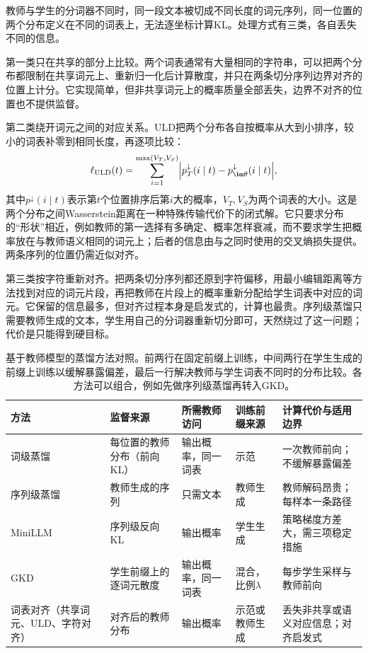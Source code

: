 教师与学生的分词器不同时，同一段文本被切成不同长度的词元序列，同一位置的两个分布定义在不同的词表上，无法逐坐标计算KL。处理方式有三类，各自丢失不同的信息。

第一类只在共享的部分上比较。两个词表通常有大量相同的字符串，可以把两个分布都限制在共享词元上、重新归一化后计算散度，并只在两条切分序列边界对齐的位置上计分。它实现简单，但非共享词元上的概率质量全部丢失，边界不对齐的位置也不提供监督。

第二类绕开词元之间的对应关系。ULD把两个分布各自按概率从大到小排序，较小的词表补零到相同长度，再逐项比较：
\begin{equation}
 \ell_{\mathrm{ULD}}(t)=\sum_{i=1}^{\max(V_T,V_S)}\Bigl\lvert p_T^{\downarrow}(i\mid t)-p_{\bm\theta}^{\downarrow}(i\mid t)\Bigr\rvert,
 \label{eq:nlp-sft-uld}
\end{equation}
其中$p^{\downarrow}(i\mid t)$表示第$t$个位置排序后第$i$大的概率，$V_T,V_S$为两个词表的大小。这是两个分布之间Wasserstein距离在一种特殊传输代价下的闭式解。它只要求分布的“形状”相近，例如教师的第一选择有多确定、概率怎样衰减，而不要求学生把概率放在与教师语义相同的词元上；后者的信息由与之同时使用的交叉熵损失提供。两条序列的位置仍需近似对齐。

第三类按字符重新对齐。把两条切分序列都还原到字符偏移，用最小编辑距离等方法找到对应的词元片段，再把教师在片段上的概率重新分配给学生词表中对应的词元。它保留的信息最多，但对齐过程本身是启发式的，计算也最贵。序列级蒸馏只需要教师生成的文本，学生用自己的分词器重新切分即可，天然绕过了这一问题；代价是只能得到硬目标。

\begin{table}[htbp]
  \small
  \begin{tabularx}{\linewidth}{@{}p{24mm}p{30mm}p{28mm}p{28mm}X@{}}
    \toprule
    方法 & 监督来源 & 所需教师访问 & 训练前缀来源 & 计算代价与适用边界\\
    \midrule
    词级蒸馏 & 每位置的教师分布（前向KL） & 输出概率，同一词表 & 示范 & 一次教师前向；不缓解暴露偏差\\
    序列级蒸馏 & 教师生成的序列 & 只需文本 & 教师生成 & 教师解码昂贵；每样本一条路径\\
    MiniLLM & 序列级反向KL & 输出概率 & 学生生成 & 策略梯度方差大，需三项稳定措施\\
    GKD & 学生前缀上的逐词元散度 & 输出概率，同一词表 & 混合，比例$\lambda$ & 每步学生采样与教师前向\\
    词表对齐（共享词元、ULD、字符对齐） & 对齐后的教师分布 & 输出概率 & 示范或教师生成 & 丢失非共享或语义对应信息；对齐启发式\\
    \bottomrule
  \end{tabularx}
  \caption{基于教师模型的蒸馏方法对照。前两行在固定前缀上训练，中间两行在学生生成的前缀上训练以缓解暴露偏差，最后一行解决教师与学生词表不同时的分布比较。各方法可以组合，例如先做序列级蒸馏再转入GKD。}
  \label{tab:nlp-sft-distillation-methods}
\end{table}

